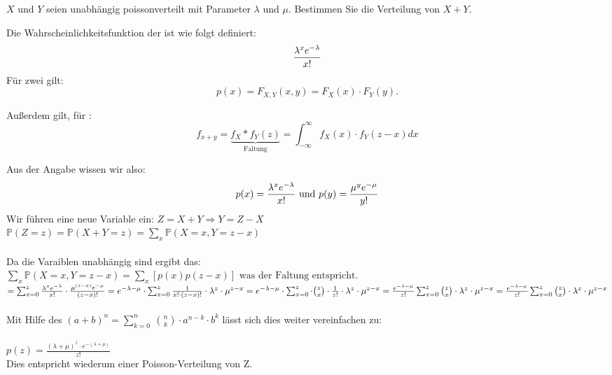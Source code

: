 \begin{uebsp}
\begin{Exercise}[label=ex:2.3]
$X$ und $Y$ seien unabhängig poissonverteilt mit Parameter $\lambda$ und $\mu$. Bestimmen Sie die Verteilung von $X + Y$.
\end{Exercise}
\begin{Answer}
\begin{uebsp_theory}
    Die Wahrscheinlichkeitsfunktion der  ist wie folgt definiert:
    \[{\lambda^xe^{-\lambda}\over x!}\]
    Für zwei  gilt: 
    \[p(x)=F_{X,Y}(x,y)=F_{X}(x)\cdot F_Y(y).\]

    Außerdem gilt, für : 
    \[f_{x+y}=\underbrace{f_X*f_Y(z)}_{\text{Faltung}}=\int_{-\infty}^{\infty}f_X(x)\cdot f_Y(z-x)dx\]
\end{uebsp_theory}

Aus der Angabe wissen wir also:
\[p(x) = {\lambda^xe^{-\lambda}\over x!}\text{ und }p(y) = {\mu^ye^{-\mu}\over y!}\]
Wir führen eine neue Variable ein: $Z=X+Y \Rightarrow Y=Z-X$ \\

$\mathbb{P}(Z=z)=\mathbb{P}(X+Y=z)=\sum_x\mathbb{P}(X=x,Y=z-x)$\\ \\
Da die Varaiblen unabhängig sind ergibt das: \\ $\sum_{x}\mathbb{P}(X=x,Y=z-x)=\sum_{x}[p(x)p(z-x)] \text{ was der Faltung entspricht.}$\\ 

$=\sum_{x=0}^{z}{\lambda^xe^{-\lambda}\over x!}\cdot{\mu^{(z-x)}e^{-\mu}\over (z-x)!}=e^{-\lambda-\mu} \cdot  \sum_{x=0}^{z} \frac{1}{x! \cdot (z-x)!} \cdot \lambda^{z} \cdot  \mu^{z-x} = e^{-\lambda-\mu} \cdot \sum_{x=0}^{z}  \cdot {z \choose x} \cdot \frac{1}{z!} \cdot \lambda^{z} \cdot  \mu^{z-x} = \frac{e^{-\lambda-\mu}}{z!}\sum_{x=0}^{z} {z \choose x} \cdot  \lambda^{z} \cdot  \mu^{z-x} = \frac{e^{-\lambda-\mu}}{z!}\sum_{x=0}^{z}  {z \choose x} \cdot \lambda^{z} \cdot  \mu^{z-x}$ 
\\ \\
Mit Hilfe des  $(a+b)^n=\sum_{k=0}^n~{n\choose k} \cdot a^{n-k} \cdot b^k$ lässt sich dies weiter vereinfachen zu: \\ \\
$p(z) = \frac{(\lambda +\mu)^{z} \cdot e^{-(\lambda+\mu)}}{z!}$\\

Dies entspricht wiederum einer Poisson-Verteilung von Z.

\end{Answer}
\end{uebsp}
